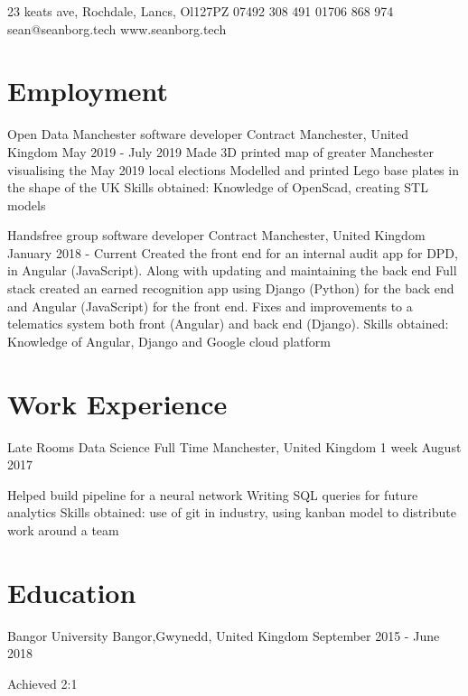 \documentclass{my_cv}
\begin{document}
\contactInfo
{23 keats ave, Rochdale, Lancs, Ol127PZ}
{07492 308 491}
{01706 868 974}
{sean@seanborg.tech}
{www.seanborg.tech}


\section{Employment}

\workDetails
{Open Data Manchester}
{software developer}
{Contract}
{Manchester, United Kingdom}
{May 2019 - July 2019}
\workdetails
{Made 3D printed map of greater Manchester visualising the May 2019 local elections }
{Modelled and printed Lego base plates in the shape of the UK}
{Skills obtained: Knowledge of  OpenScad, creating STL models}
\stopworkdetails

\workDetails
{Handsfree group}
{software developer}
{Contract} %
{Manchester, United Kingdom}
{January 2018 - Current}
\workdetails
{Created the front end for an internal audit app for DPD, in Angular (JavaScript). Along with updating and maintaining the back end }
{Full stack created an earned recognition app using Django (Python) for the back end and Angular (JavaScript) for the front end.}
{Fixes and improvements to a telematics system both front (Angular) and back end (Django).}
{Skills obtained: Knowledge of  Angular, Django and Google cloud platform}
\stopworkdetails

\section{Work Experience}
\workDetails
{Late Rooms}
{Data Science}
{Full Time}
{Manchester, United Kingdom}
{1 week August 2017}

\workdetails
{Helped build pipeline for a neural network}
{Writing SQL queries for future analytics}
{Skills obtained: use of git in industry, using kanban model to distribute work around a team}
\stopworkdetails

\section{Education}
\educationDetails
{Bangor University}
{Bangor,Gwynedd, United Kingdom}
{September 2015 - June 2018}

Achieved  2:1
\end{document}
